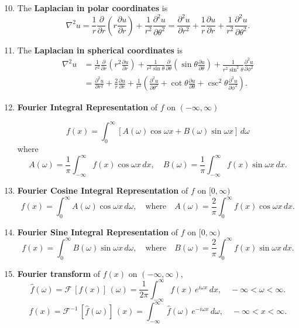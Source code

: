 \begin{enumerate}

\setcounter{enumi}{9}

\item The \textbf{Laplacian in polar coordinates} is
\[\nabla^{2} u = \frac{1}{r}\frac{\partial}{\partial r}\left( r\frac{\partial u}{\partial r} \right) +\frac{1}{r^{2}}\frac{\partial^{2} u}{\partial \theta^{2}} = \frac{\partial^{2} u}{\partial r^{2}} + \frac{1}{r}\frac{\partial u}{\partial r} + \frac{1}{r^{2}}\frac{\partial^{2} u}{\partial \theta^{2}}.\]

\item The \textbf{Laplacian in spherical coordinates} is
\[
\begin{aligned}\nabla^{2} u & = \frac{1}{r^{2}}\frac{\partial}{\partial r}\left( r^{2} \frac{\partial u}{\partial r} \right) + \frac{1}{r^{2}\sin \theta} \frac{\partial}{\partial \theta}\left( \sin\theta \frac{\partial u}{\partial \theta} \right) + \frac{1}{r^{2}\sin^{2}\theta} \frac{\partial^{2} u}{\partial \phi^{2}} \\
& = \frac{\partial^{2} u}{\partial r^{2}} + \frac{2}{r}\frac{\partial u}{\partial r} + \frac{1}{r^{2}}\left( \frac{\partial^{2} u}{\partial \theta^{2}} + \cot \theta \frac{\partial u}{\partial \theta} + \csc^{2}\theta \frac{\partial^{2}u}{\partial \phi^{2}} \right).
\end{aligned}
\]


\item \textbf{Fourier Integral Representation} of $f$ on $(-\infty,\infty)$

\[f(x) = \int _{0}^{\infty} \left[A(\omega)\cos \omega x + B(\omega) \sin \omega x \right]\, d\omega\]
where 
\[A(\omega) = \frac{1}{\pi}\int _{-\infty}^{\infty} f(x)\cos \omega x \, dx ,\quad B(\omega) = \frac{1}{\pi} \int_{-\infty}^{\infty} f(x) \sin \omega x \,dx.\]

\item \textbf{Fourier Cosine Integral Representation} of $f$ on $[0,\infty)$
\[f(x) = \int _{0}^{\infty} A(\omega)\cos \omega x \, d\omega, \quad \text{where} \quad A(\omega) = \frac{2}{\pi}\int _{0}^{\infty} f(x)\cos \omega x \, dx .\]


\item \textbf{Fourier Sine Integral Representation} of $f$ on $[0,\infty)$
\[f(x) = \int _{0}^{\infty} B(\omega)\sin \omega x \, d\omega, \quad \text{where} \quad B(\omega) = \frac{2}{\pi}\int _{0}^{\infty} f(x)\sin \omega x \, dx .\]


\item \textbf{Fourier transform} of $f(x)$ on $(-\infty,\infty)$,
\[\widehat{f}(\omega) = \mathcal{F} \, [f(x)] \,(\omega) =  \frac{1}{2\pi} \int_{-\infty} ^{\infty}f(x) \,e^{i\omega x} \,dx, \quad -\infty < \omega <\infty.\]
\[{f}(x) = \mathcal{F}^{-1} \, [\widehat{f}(\omega)] \,(x) =  \int_{-\infty} ^{\infty}\widehat{f}(\omega) \,e^{-i\omega x} \,d\omega, \quad -\infty < x <\infty.\]


\end{enumerate}
